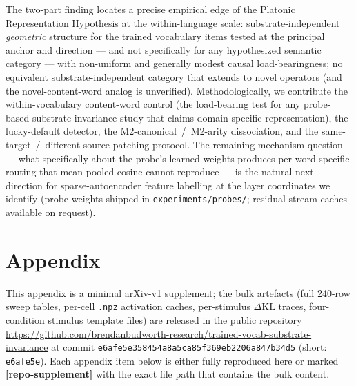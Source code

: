 \documentclass[11pt,letterpaper]{article}
\newcommand{\dkl}{\ensuremath{\Delta\mathrm{KL}}}
\newcommand{\Mc}{M2-canonical}
\newcommand{\Ma}{M2-arity}
\begin{document}
The two-part finding locates a precise empirical edge of the
Platonic Representation Hypothesis at the within-language scale:
substrate-independent \emph{geometric} structure for the trained
vocabulary items tested at the principal anchor and direction ---
and not specifically for any hypothesized semantic category --- with
non-uniform and generally modest causal load-bearingness; no
equivalent substrate-independent category that extends to novel
operators (and the novel-content-word analog is unverified).
Methodologically, we contribute the within-vocabulary content-word
control (the load-bearing test for any probe-based
substrate-invariance study that claims domain-specific
representation), the lucky-default detector, the \Mc{}~/~\Ma{}
dissociation, and the same-target~/~different-source patching
protocol. The remaining mechanism question --- what specifically
about the probe's learned weights produces per-word-specific routing
that mean-pooled cosine cannot reproduce --- is the natural next
direction for sparse-autoencoder feature labelling at the layer
coordinates we identify (probe weights shipped in
\texttt{experiments/probes/}; residual-stream caches available on
request).



\appendix
\renewcommand{\subsectionautorefname}{Appendix}
\makeatletter
\renewcommand\subsection{\@startsection{subsection}{2}{\z@}%
  {1.0ex \@plus0.4ex \@minus 0.2ex}%
  {0.6ex \@plus 0.2ex}%
  {\normalfont\large\bfseries}}
\makeatother
\section*{Appendix}

This appendix is a minimal arXiv-v1 supplement; the bulk artefacts
(full 240-row sweep tables, per-cell \texttt{.npz} activation caches,
per-stimulus \dkl{} traces, four-condition stimulus template files)
are released in the public repository
\url{https://github.com/brendanbudworth-research/trained-vocab-substrate-invariance}
at commit \texttt{e6afe5e358454a8a5ca85f369eb2206a847b34d5} (short:
\texttt{e6afe5e}). Each appendix item below is either fully
reproduced here or marked \textbf{[repo-supplement]} with the exact
file path that contains the bulk content.
\end{document}
